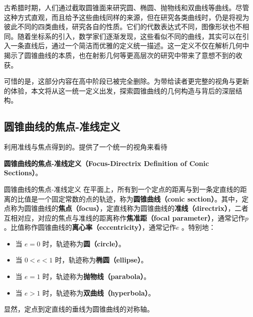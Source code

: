 
\begin{issues}
\issueDraft
\end{issues}


古希腊时期，人们通过截取圆锥面来研究圆、椭圆、抛物线和双曲线等曲线。尽管这种方式直观，而且给予这些曲线同样的来源，但在研究各类曲线时，仍是将视为彼此不同的四类曲线，研究各自的性质。它们的代数表达式不同，图像形状也不相同。随着坐标系的引入，数学家们逐渐发现，这些看似不同的曲线，其实可以在引入一条直线后，通过一个简洁而优雅的定义统一描述。这一定义不仅在解析几何中揭示了圆锥曲线的本质，也在射影几何等更高层次的研究中带来了意想不到的收获。

可惜的是，这部分内容在高中阶段已被完全删除。为带给读者更完整的视角与更新的体验，本文将从这一统一定义出发，探索圆锥曲线的几何构造与背后的深层结构。


\subsection{圆锥曲线的焦点-准线定义}

利用准线与焦点得到的。提供了一个统一的视角来看待

\textbf{圆锥曲线的焦点-准线定义（Focus-Directrix Definition of Conic Sections）}。

\begin{definition}{圆锥曲线的焦点-准线定义}
在平面上，所有到一个定点的距离与到一条定直线的距离的比值是一个固定常数的点的轨迹，称为\textbf{圆锥曲线（conic section）}。其中，定点称为圆锥曲线的\textbf{焦点（focus）}，定直线称为圆锥曲线的\textbf{准线（directrix）}，二者互相对应，对应的焦点与准线的距离称作\textbf{焦准距（focal parameter）}，通常记作$p$。比值称作圆锥曲线的\textbf{离心率（eccentricity）}，通常记作$e$ 。特别地：
\begin{itemize}
\item 当 $e = 0$ 时，轨迹称为\textbf{圆（circle）}。
\item 当 $0 < e < 1$ 时，轨迹称为\textbf{椭圆（ellipse）}。
\item 当 $e = 1$ 时，轨迹称为\textbf{抛物线（parabola）}。
\item 当 $e > 1$ 时，轨迹称为\textbf{双曲线（hyperbola）}。
\end{itemize}
\end{definition}

显然，定点到定直线的垂线为圆锥曲线的对称轴。

